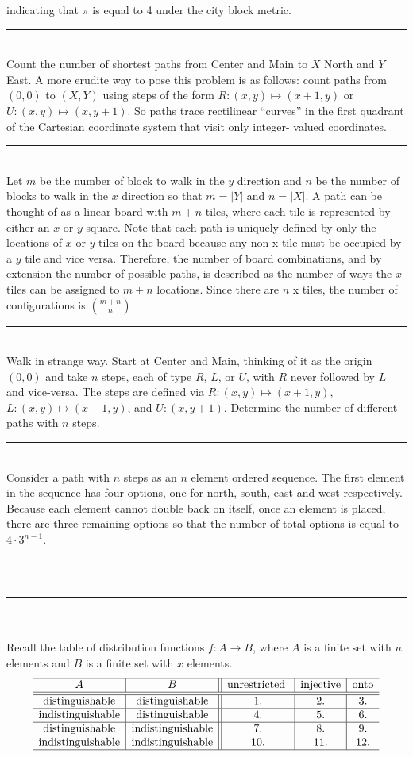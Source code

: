 \documentclass{article}
\newcommand{\problemsep}{\leavevmode\\[0.05in] \rule[\baselineskip/4]{\textwidth}{1pt} \\[0.005in] \rule[\baselineskip]{\textwidth}{1pt}\vspace{-\baselineskip/2}\leavevmode\\[0.05in]}
\newcommand{\statementsep}{\leavevmode\\[0.005in] \rule[\baselineskip/4]{\textwidth}{0.4pt}\leavevmode\\[0.005in]}
\begin{document}
indicating that $\pi$ is equal to 4 under the city block metric.
\statementsep
{}  Count the number of shortest paths from Center and Main to 
$X$ North and $Y$ East.  A more erudite way to pose this problem is as follows: 
count paths from $(0,0)$ to $(X,Y)$ using steps of the form $R: (x,y) \mapsto 
(x+1,y)$ or $U:(x,y) \mapsto (x,y+1)$.  So paths trace rectilinear ``curves'' in 
the first quadrant of the Cartesian coordinate system that visit only integer-
valued coordinates.
\statementsep
Let $m$ be the number of block to walk in the $y$ direction and $n$ be the number of blocks to walk in the $x$ direction so that $m = \lvert Y \rvert$ and $n = \lvert X \rvert $. A path can be thought of as a linear board with $m + n$ tiles, where each tile is represented by either an $x$ or $y$ square. Note that each path is uniquely defined by only the locations of $x$ or $y$ tiles on the board because any non-x tile must be occupied by a $y$ tile and vice versa. Therefore, the number of board combinations, and by extension the number of possible paths, is described as the number of ways the $x$ tiles can be assigned to $m + n$ locations. Since there are $n$ x tiles, the number of configurations is ${m + n} \choose n$.
\statementsep
{}  Walk in strange way.  Start at Center and Main, thinking of
it as the origin $(0,0)$ and take $n$ steps, each of type $R$, $L$, or $U$, with 
$R$ never followed by $L$ and vice-versa. The steps are defined via $R:(x,y) \mapsto (x+1,y)$, $L:(x,y) \mapsto (x-1,y)$, and $U:(x, y+1)$.
Determine the number of different paths with $n$ steps.
\statementsep
Consider a path with $n$ steps as an $n$ element ordered sequence. The first element in the sequence has four options, one for north, south, east and west respectively. Because each element cannot double back on itself, once an element is placed, there are three remaining options so that the number of total options is equal to $4 \cdot 3^{n-1}$.
\problemsep
\noindent \maltese \hspace{1ex}{\bf Sub-Experience Three: The Master Table of Distributions.} \\
\noindent  Recall the table of distribution functions $f:A \to B$, where $A$ is a 
finite set with $n$ elements and $B$ is a finite set with $x$ elements.
\begin{equation*}
\begin{array}{c|c||c|c|c}
\hline A & B & \mbox{unrestricted }& \mbox{injective}& \mbox{onto} \\ \hline \hline
\mbox{distinguishable} & \mbox{distinguishable} & 1. & 2. & 3. \\ \hline
\mbox{indistinguishable}& \mbox{distinguishable}&4.&5.&6. \\ \hline
\mbox{distinguishable} & \mbox{indistinguishable}& 7. & 8. & 9. \\ \hline
\mbox{indistinguishable}&\mbox{indistinguishable}& 10. &11.&12. \\ \hline 
\end{array}\end{equation*}
\end{document}

